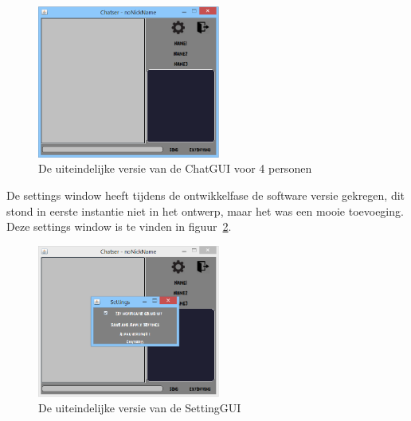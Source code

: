 \documentclass[12pt]{article}
\begin{document}
\begin{figure}[ht]
\begin{center}
\includegraphics[width = 60mm]{chatser}
\caption{De uiteindelijke versie van de ChatGUI voor 4 personen}
\label{figure008}
\end{center}
\end{figure}
\noindent De settings window heeft tijdens de ontwikkelfase de software versie gekregen, dit stond in eerste instantie niet in het ontwerp, maar het was een mooie toevoeging. Deze settings window is te vinden in figuur~\ref{figure009}.
\begin{figure}[ht]
\begin{center}
\includegraphics[width = 60mm]{chatsersettingsaan}
\caption{De uiteindelijke versie van de SettingGUI}
\label{figure009}
\end{center}
\end{figure}
\\
\end{document}
